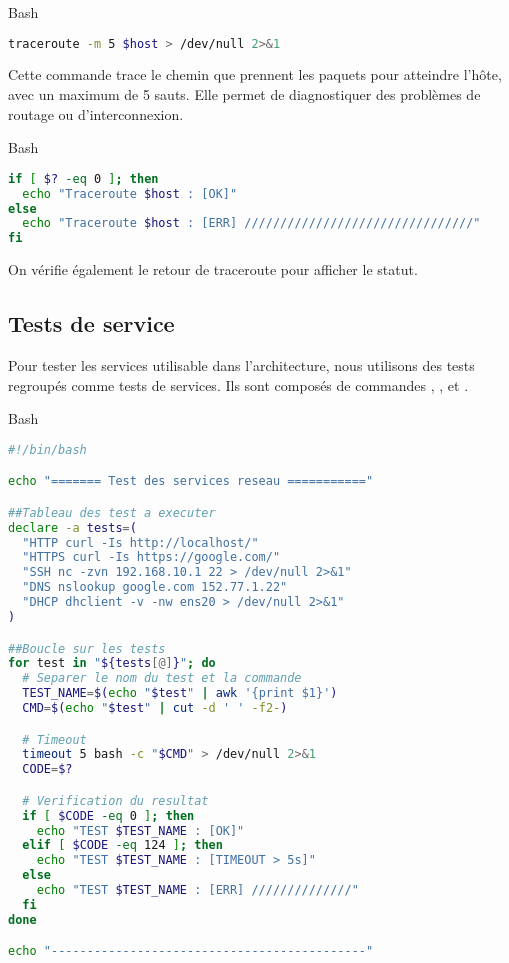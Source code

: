 \documentclass{article}
\begin{document}
\begin{codebox}{Bash}
\begin{lstlisting}[language=Bash]
traceroute -m 5 $host > /dev/null 2>&1
\end{lstlisting}
\end{codebox}


Cette commande trace le chemin que prennent les paquets pour atteindre l’hôte, avec un maximum de 5 sauts. Elle permet de diagnostiquer des problèmes de routage ou d’interconnexion.

\begin{codebox}{Bash}
\begin{lstlisting}[language=Bash]
if [ $? -eq 0 ]; then
  echo "Traceroute $host : [OK]"
else
  echo "Traceroute $host : [ERR] ////////////////////////////////"
fi
\end{lstlisting}
\end{codebox}


On vérifie également le retour de traceroute pour afficher le statut.

\subsection{Tests de service}

Pour tester les services utilisable dans l'architecture, nous utilisons des tests regroupés comme tests de services. Ils sont composés de commandes , ,  et . 

\begin{codebox}{Bash}
\begin{lstlisting}[language=Bash]
#!/bin/bash

echo "======= Test des services reseau ==========="

##Tableau des test a executer
declare -a tests=(
  "HTTP curl -Is http://localhost/"
  "HTTPS curl -Is https://google.com/"
  "SSH nc -zvn 192.168.10.1 22 > /dev/null 2>&1"
  "DNS nslookup google.com 152.77.1.22"
  "DHCP dhclient -v -nw ens20 > /dev/null 2>&1"
)

##Boucle sur les tests
for test in "${tests[@]}"; do
  # Separer le nom du test et la commande
  TEST_NAME=$(echo "$test" | awk '{print $1}')
  CMD=$(echo "$test" | cut -d ' ' -f2-)

  # Timeout
  timeout 5 bash -c "$CMD" > /dev/null 2>&1
  CODE=$?

  # Verification du resultat
  if [ $CODE -eq 0 ]; then
    echo "TEST $TEST_NAME : [OK]"
  elif [ $CODE -eq 124 ]; then
    echo "TEST $TEST_NAME : [TIMEOUT > 5s]"
  else
    echo "TEST $TEST_NAME : [ERR] //////////////"
  fi
done

echo "--------------------------------------------"
\end{lstlisting}
\end{codebox}
\end{document}
